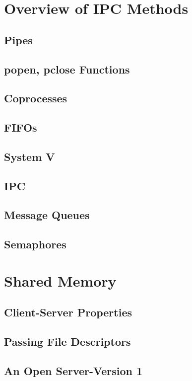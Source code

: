 \documentclass{article}
\begin{document}
	\section{Overview of IPC Methods}
	\subsection{Pipes}
	\subsection{popen, pclose Functions}
	\subsection{Coprocesses}
	\subsection{FIFOs}
	\subsection{System V}
	\subsection{IPC}
	\subsection{Message Queues}
	\subsection{Semaphores}
	
	\section{Shared Memory}
	\subsection{Client-Server Properties}
	\subsection{Passing File Descriptors}
	\subsection{An Open Server-Version 1}
\end{document}
